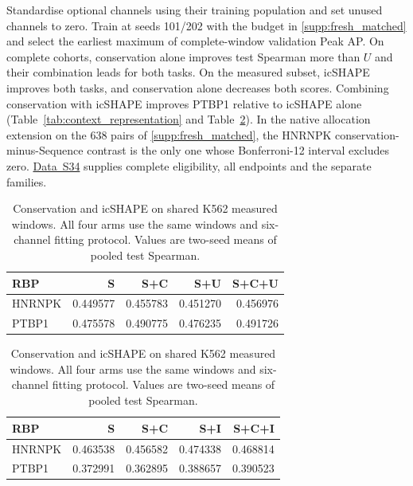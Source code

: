 \documentclass[11pt,a4paper]{article}
\newcommand{\tableid}[1]{\setcounter{table}{\numexpr#1-1\relax}}
\newcommand{\sr}[1]{\ref{#1}}
\newcommand{\tref}[1]{Table~\ref{#1}}
\newcommand{\data}[1]{\hyperref[data:S#1]{Data~S#1}}
\begin{document}
Standardise optional channels using their training population and set unused channels to zero. Train at seeds 101/202 with the budget in \sr{supp:fresh_matched} and select the earliest maximum of complete-window validation Peak AP. On complete cohorts, conservation alone improves test Spearman more than $U$ and their combination leads for both tasks. On the measured subset, icSHAPE improves both tasks, and conservation alone decreases both scores. Combining conservation with icSHAPE improves PTBP1 relative to icSHAPE alone (\tref{tab:context_representation} and \tref{tab:measured_context}). In the native allocation extension on the 638 pairs of \sr{supp:fresh_matched}, the HNRNPK conservation-minus-Sequence contrast is the only one whose Bonferroni-12 interval excludes zero. \data{34} supplies complete eligibility, all endpoints and the separate families.

\begin{table}[H]\centering
\begin{minipage}[t]{.485\linewidth}\centering\small\setlength{\tabcolsep}{2pt}
\captionsetup{type=table,position=top}
\tableid{7}
\caption{Conservation and predicted accessibility on the complete K562 cohorts. Values are mean task-pooled test Spearman across two matched seeds in each six-channel arm.}
\label{tab:context_representation}
\small
\begin{tabular}{@{}lrrrr@{}}
\toprule
RBP & S & S+C & S+U & S+C+U \\
\midrule
HNRNPK & 0.449577 & 0.455783 & 0.451270 & 0.456976 \\
PTBP1 & 0.475578 & 0.490775 & 0.476235 & 0.491726 \\
\bottomrule
\end{tabular}
\end{minipage}%
\hfill
\begin{minipage}[t]{.485\linewidth}\centering\small\setlength{\tabcolsep}{2pt}
\captionsetup{type=table,position=top}
\tableid{8}
\caption{Conservation and icSHAPE on shared K562 measured windows. All four arms use the same windows and six-channel fitting protocol. Values are two-seed means of pooled test Spearman.}
\label{tab:measured_context}
\small
\begin{tabular}{@{}lrrrr@{}}
\toprule
RBP & S & S+C & S+I & S+C+I \\
\midrule
HNRNPK & 0.463538 & 0.456582 & 0.474338 & 0.468814 \\
PTBP1 & 0.372991 & 0.362895 & 0.388657 & 0.390523 \\
\bottomrule
\end{tabular}
\end{minipage}
\end{table}
\end{document}
